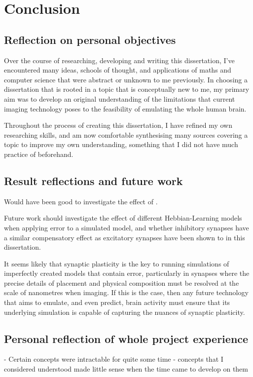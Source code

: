 \chapter{Conclusion}

\section{Reflection on personal objectives}

Over the course of researching, developing and writing this dissertation, I've
encountered many ideas, schools of thought, and applications of maths and
computer science that were abstract or unknown to me previously. In choosing a
dissertation that is rooted in a topic that is conceptually new to me, my
primary aim was to develop an original understanding of the limitations that
current imaging technology poses to the feasibility of emulating the whole human
brain. 

Throughout the process of creating this dissertation, I have refined my own
researching skills, and am now comfortable synthesising many sources
covering a topic to improve my own understanding, something that I did not have
much practice of beforehand. 

\section{Result reflections and future work}

Would have been good to investigate the effect of .

Future work should investigate the effect of different Hebbian-Learning models
when applying error to a simulated model, and whether inhibitory synapses have a
similar compensatory effect as excitatory synapses have been shown to in this dissertation.

It seems likely that synaptic plasticity is the key to running simulations of
imperfectly created models that contain error, particularly in synapses where
the precise details of placement and physical composition must be resolved at
the scale of nanometres when imaging. If this is the case, then any future
technology that aims to emulate, and even predict, brain activity must ensure
that its underlying simulation is capable of capturing the nuances of synaptic plasticity.

\section{Personal reflection of whole project experience}
 - Certain concepts were intractable for quite some time 
 - concepts that I considered understood made little sense when the time came to
 develop on them 


